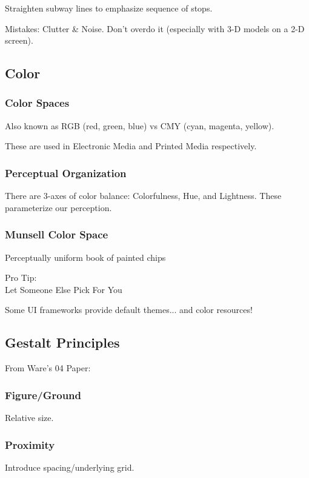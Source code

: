 Straighten subway lines to emphasize sequence of stops.

\begin{important}
Mistakes: Clutter \& Noise. Don't overdo it (especially with 3-D models on a 2-D screen).
\end{important}

\subsection{Color}
\subsubsection{Color Spaces}
Also known as RGB (red, green, blue) vs CMY (cyan, magenta, yellow).

These are used in Electronic Media and Printed Media respectively.

\subsubsection{Perceptual Organization}
There are 3-axes of color balance: Colorfulness, Hue, and Lightness. These parameterize our perception.

\subsubsection{Munsell Color Space}
Perceptually uniform book of painted chips

\begin{shaded}
Pro Tip:\\
Let Someone Else Pick For You
\end{shaded}

Some UI frameworks provide default themes... and color resources!

\subsection{Gestalt Principles}
From Ware's 04 Paper:

\subsubsection{Figure/Ground}
Relative size.

\subsubsection{Proximity}
Introduce spacing/underlying grid.

